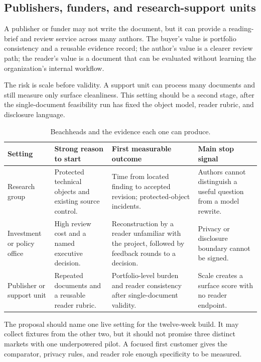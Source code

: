 \subsection{Publishers, funders, and research-support units}

A publisher or funder may not write the document, but it can provide a
reading-brief and review service across many authors. The buyer's value is
portfolio consistency and a reusable evidence record; the author's value is a
clearer review path; the reader's value is a document that can be evaluated
without learning the organization's internal workflow.

The risk is scale before validity. A support unit can process many documents
and still measure only surface cleanliness. This setting should be a second
stage, after the single-document feasibility run has fixed the object model,
reader rubric, and disclosure language.

\begin{table}[H]
\centering
\small
\begin{tabularx}{\textwidth}{@{}p{}p{}p{}L@{}}
\toprule
Setting & Strong reason to start & First measurable outcome & Main stop signal \\
\midrule
Research group & Protected technical objects and existing source control. &
Time from located finding to accepted revision; protected-object incidents. &
Authors cannot distinguish a useful question from a model rewrite. \\
Investment or policy office & High review cost and a named executive decision. &
Reconstruction by a reader unfamiliar with the project, followed by feedback rounds to a decision. &
Privacy or disclosure boundary cannot be signed. \\
Publisher or support unit & Repeated documents and a reusable reader rubric. &
Portfolio-level burden and reader consistency after single-document validity. &
Scale creates a surface score with no reader endpoint. \\
\bottomrule
\end{tabularx}
\caption{Beachheads and the evidence each one can produce.}
\label{tab:beachheads}
\end{table}

The proposal should name one live setting for the twelve-week build. It may
collect fixtures from the other two, but it should not promise three distinct
markets with one underpowered pilot. A focused first customer gives the
comparator, privacy rules, and reader role enough specificity to be measured.

